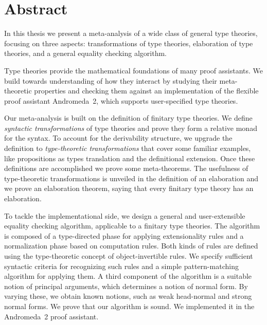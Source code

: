 \chapter{Abstract}

In this thesis we present a meta-analysis of a wide class of general type theories, focusing on three aspects: transformations of type theories, elaboration of type theories, and a general equality checking algorithm.

Type theories provide the mathematical foundations of many proof assistants. We build towards understanding of how they interact by studying their meta-theoretic properties and checking them against an implementation of the flexible proof assistant Andromeda~2, which supports user-specified type theories.

Our meta-analysis is built on the definition of finitary type theories. We define \emph{syntactic transformations} of type theories and prove they form a relative monad for the syntax. To account for the derivability structure, we upgrade the definition to \emph{type-theoretic transformations} that cover some familiar examples, like propositions as types translation and the definitional extension. Once these definitions are accomplished we prove some meta-theorems.
%
The usefulness of type-theoretic transformations is unveiled in the definition of an elaboration and we prove an elaboration theorem, saying that every finitary type theory has an elaboration.

To tackle the implementational side, we design a general and user-extensible equality checking algorithm, applicable to a finitary type theories. The algorithm is composed of a type-directed phase for applying extensionality rules and a normalization phase based on computation rules. Both kinds of rules are defined using the type-theoretic concept of object-invertible rules. We specify sufficient syntactic criteria for recognizing such rules and a simple pattern-matching algorithm for applying them.
A third component of the algorithm is a suitable notion of principal arguments, which determines a notion of normal form. By varying these, we obtain known notions, such as weak head-normal and strong normal forms.
%
We prove that our algorithm is sound.
%
We implemented it in the Andromeda~2 proof assistant.

\vspace{\baselineskip}

